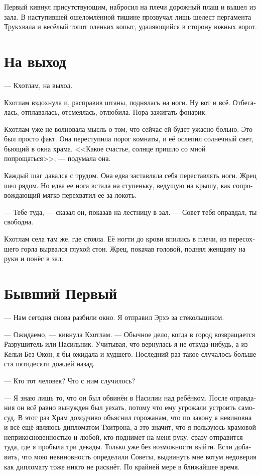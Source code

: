 \documentclass[a4paper,12pt,fleqn]{book}\usepackage{cooltooltips}\usepackage{polyglossia}\setdefaultlanguage{russian}\setotherlanguage{english}\defaultfontfeatures{Ligatures=TeX,Mapping=tex-text} \usepackage{xcolor}\definecolor{lightgray}{HTML}{bbbbbb}\color{lightgray}\newcommand{\ml}[3]{\textenglish{\textcolor{black}{#3}}}
\begin{document}
Первый кивнул присутствующим, набросил на плечи дорожный плащ и вышел из зала.
В наступившей ошеломлённой тишине прозвучал лишь шелест пергамента Трукхвала и весёлый топот оленьих копыт, удаляющийся в сторону южных ворот.

\section{На выход}

--- Кхотлам, на выход.

Кхотлам вздохнула и, расправив штаны, поднялась на ноги.
Ну вот и всё.
Отбегалась, отплавалась, отсмеялась, отлюбила.
Пора зажигать фонарик.

Кхотлам уже не волновала мысль о том, что сейчас ей будет ужасно больно.
Это был просто факт.
Она переступила порог комнаты, и её ослепил солнечный свет, бьющий в окна храма.
<<Какое счастье, солнце пришло со мной попрощаться>>, --- подумала она.

Каждый шаг давался с трудом.
Она едва заставляла себя переставлять ноги.
Жрец шел рядом.
Но едва ее нога встала на ступеньку, ведущую на крышу, как сопровождающий мягко перехватил ее за локоть.

--- Тебе туда, --- сказал он, показав на лестницу в зал.
--- Совет тебя оправдал, ты свободна.

Кхотлам села там же, где стояла.
Её ногти до крови впились в плечи, из пересохшего горла вырвался глухой стон.
Жрец, покачав головой, поднял женщину на руки и понёс в зал.

\section{Бывший Первый}

--- Нам сегодня снова разбили окно.
Я отправил Эрхэ за стекольщиком.

--- Ожидаемо, --- кивнула Кхотлам.
--- Обычное дело, когда в город возвращается Разрушитель или Насильник.
Учитывая, что вернулась я не откуда-нибудь, а из Кельи Без Окон, я бы ожидала и худшего.
Последний раз такое случалось больше ста пятидесяти дождей назад.

--- Кто тот человек?
Что с ним случилось?

--- Я знаю лишь то, что он был обвинён в Насилии над ребёнком.
После оправдания он всё равно вынужден был уехать, потому что ему угрожали устроить самосуд.
В этот раз Храм доходчиво объяснил горожанам, что по закону я невиновна и всё ещё являюсь дипломатом Тхитрона, а это значит, что я пользуюсь храмовой неприкосновенностью и любой, кто поднимет на меня руку, сразу отправится туда, где я пробыла три декады.
Только уже без возможности выйти.
Если добавить, что мою невиновность определили Советы, выдвинуть мне вотум недоверия как дипломату тоже никто не рискнёт.
По крайней мере в ближайшее время.
\end{document}
